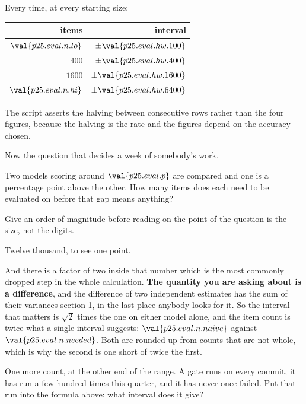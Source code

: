 \begin{fr}

Every time, at every starting size:

\begin{center}
\begin{tabular}{rr}
\toprule
items & interval \\
\midrule
$\val{p25.eval.n.lo}$ & $\pm\val{p25.eval.hw.100}$ \\
$400$ & $\pm\val{p25.eval.hw.400}$ \\
$1600$ & $\pm\val{p25.eval.hw.1600}$ \\
$\val{p25.eval.n.hi}$ & $\pm\val{p25.eval.hw.6400}$ \\
\bottomrule
\end{tabular}
\end{center}

The script asserts the halving between consecutive rows rather than the four
figures, because the halving is the rate and the figures depend on the
accuracy chosen.
\end{fr}

\begin{fr}
Now the question that decides a week of somebody's work.

Two models scoring around $\val{p25.eval.p}$ are compared and one is a
percentage point above the other. How many items does each need to be
evaluated on before that gap means anything?

Give an order of magnitude before reading on \dash{} the point of the question
is the size, not the digits.
\dotline
\nextframe
\end{fr}

\begin{fr}

Twelve thousand, to see one point.

And there is a factor of two inside that number which is the most commonly
dropped step in the whole calculation. \textbf{The quantity you are asking
about is a difference}, and the difference of two independent estimates has
the sum of their variances \dash{} section 1, in the last place anybody looks
for it. So the interval that matters is $\sqrt{2}$ times the one on either
model alone, and the item count is twice what a single interval suggests:
$\val{p25.eval.n.naive}$ against $\val{p25.eval.n.needed}$. Both are rounded
up from counts that are not whole, which is why the second is one short of
twice the first.

One more count, at the other end of the range. A gate runs on every commit,
it has run a few hundred times this quarter, and it has never once failed.
Put that run into the formula above: what interval does it give?
\dotline
\nextframe
\end{fr}

